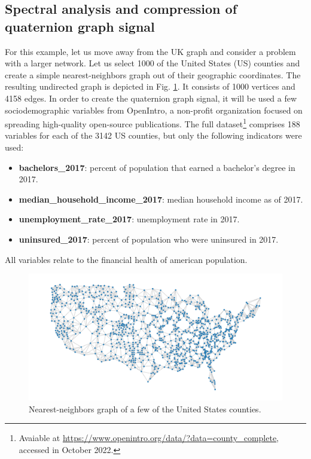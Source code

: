 \subsection{Spectral analysis and compression of quaternion graph signal}

For this example, let us move away from the UK graph and consider a problem with a larger network. Let us select 1000 of the United States (US) counties and create a simple nearest-neighbors graph out of their geographic coordinates. The resulting undirected graph is depicted in Fig. \ref{fig:us_graph}. It consists of 1000 vertices and 4158 edges. In order to create the quaternion graph signal, it will be used a few sociodemographic variables from OpenIntro, a non-profit organization focused on spreading high-quality open-source publications. The full dataset\footnote{Avaiable at \url{https://www.openintro.org/data/?data=county_complete}, accessed in October 2022.} comprises 188 variables for each of the 3142 US counties, but only the following indicators were used:
\begin{itemize}[noitemsep]
\item \textbf{bachelors\_2017}: percent of population that earned a bachelor's degree in 2017.
\item \textbf{median\_household\_income\_2017}: median household income as of 2017.
\item \textbf{unemployment\_rate\_2017}: unemployment rate in 2017.
\item \textbf{uninsured\_2017}: percent of population who were uninsured in 2017.
\end{itemize}
All variables relate to the financial health of american population. 

\begin{figure}
\centering
\includegraphics[width=0.8\linewidth]{thesis/Figures/usa_example/us_graph.pdf}
\caption{Nearest-neighbors graph of a few of the United States counties.}
\label{fig:us_graph}
\end{figure}

